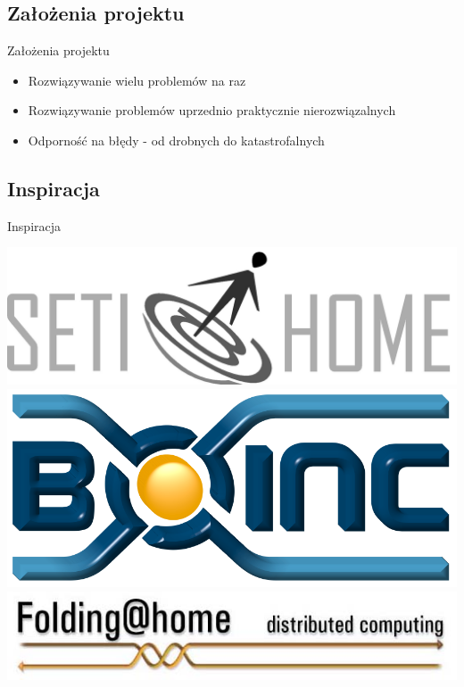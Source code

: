 \documentclass[12pt]{beamer}
\begin{document}
\subsection{Założenia projektu}
\begin{frame}{Założenia projektu}
\begin{itemize}
	\item Rozwiązywanie wielu problemów na raz
	\item Rozwiązywanie problemów uprzednio praktycznie nierozwiązalnych
	\item Odporność na błędy - od drobnych do katastrofalnych
\end{itemize}
\end{frame}

\subsection{Inspiracja}
\begin{frame}{Inspiracja}
\begin{center}
\includegraphics[scale=0.30]{sah_logo}\\ \vspace{25pt}
\includegraphics[scale=0.20]{boinc_logo} \\ \vspace{25pt}
\includegraphics[scale=0.40]{folding_logo}
\end{center}
\end{frame}
\end{document}
